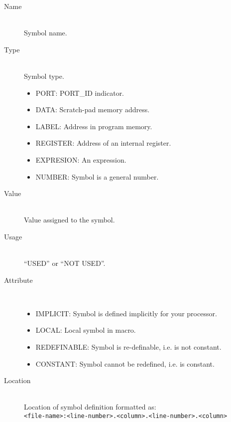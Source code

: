             \begin{description}
                \item[Name]~\\
                    Symbol name.
                \item[Type]~\\
                    Symbol type.
                    \begin{itemize}
                        \item PORT: PORT\_ID indicator.
                        \item DATA: Scratch-pad memory address.
                        \item LABEL: Address in program memory.
                        \item REGISTER: Address of an internal register.
                        \item EXPRESION: An expression.
                        \item NUMBER: Symbol is a general number.
                    \end{itemize}
                \item[Value]~\\
                    Value assigned to the symbol.
                \item[Usage]~\\
                    ``USED'' or ``NOT USED''.
                \item[Attribute]~\\
                    \begin{itemize}
                        \item IMPLICIT: Symbol is defined implicitly for your processor.
                        \item LOCAL: Local symbol in macro.
                        \item REDEFINABLE: Symbol is re-definable, i.e. is not constant.
                        \item CONSTANT: Symbol cannot be redefined, i.e. is constant.
                    \end{itemize}
                \item[Location]~\\
                    Location of symbol definition formatted as:\\
                    \texttt{<file-name>:<line-number>.<column>.<line-number>.<column>}
            \end{description}

